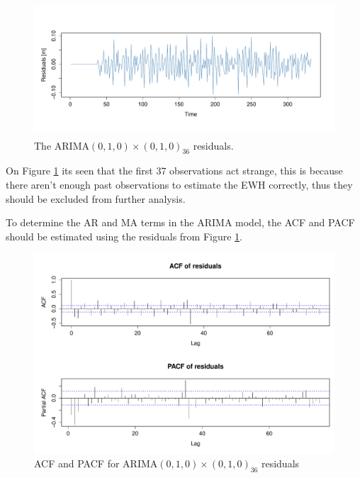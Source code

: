 \begin{figure}[H]
\centering
\includegraphics[height=5cm]{figures/ts-residual-i1s1}
\caption{The ARIMA$(0,1,0) \times (0,1,0)_{36}$ residuals.}
\label{fig:ts-residual-i1s1}
\end{figure}
On Figure \ref{fig:ts-residual-i1s1} its seen that the first 37 observations act strange, this is because there aren't enough past observations to estimate the EWH correctly, thus they should be excluded from further analysis.

To determine the AR and MA terms in the ARIMA model, the ACF and PACF should be estimated using the residuals from Figure \ref{fig:ts-residual-i1s1}.
\begin{figure}[H]
	\centering
	\includegraphics[width=\textwidth]{figures/ts-acf-ar0s0}
	\caption{ACF and PACF for ARIMA$(0,1,0) \times (0,1,0)_{36}$ residuals}
	\label{fig:ts-acf-ar0s0}
\end{figure}

